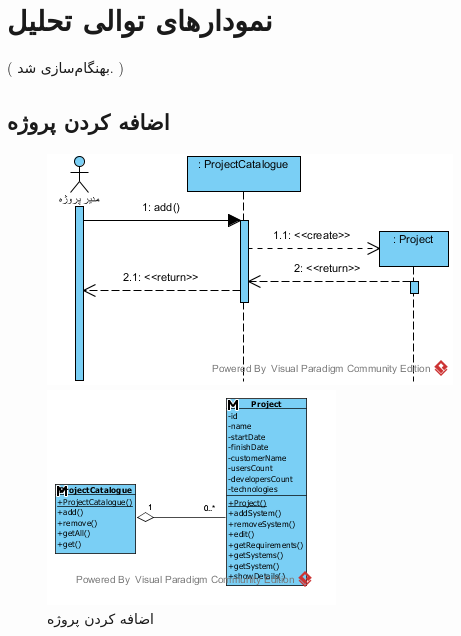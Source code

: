 \chapter{نمودارهای توالی تحلیل}
({ \color{red} بهنگام‌سازی شد. })
\newpage
\section{اضافه کردن پروژه}
\begin{figure}[H]
	\centering
	\includegraphics[scale=0.8]{img/sequence-analysis/AddProjectToOrganization}
	
	
	\includegraphics[scale=0.8]{img/sequence-analysis/AddProjectToOrganizationC}
	\caption{اضافه کردن پروژه}
\end{figure}

